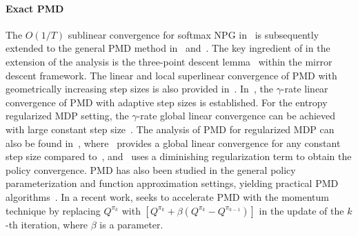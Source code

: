 \documentclass[10pt]{article}
\theoremstyle{plain}
\theoremstyle{definition}
\begin{document}
\paragraph{Exact PMD} The $O(1/T)$ sublinear convergence for softmax NPG in~\cite{Agarwal_Kakade_Lee_Mahajan_2019} is subsequently extended to the general PMD method in~\cite{Xiao_2022} and~\cite{Lan_2021}. The key ingredient of in the extension of the analysis is the three-point descent lemma~\cite{chen1993convergence} within the mirror descent framework. The linear and local superlinear convergence of PMD with geometrically increasing step sizes is also provided in~\cite{Xiao_2022}. In~\cite{Johnson_Pike-Burke_Rebeschini_2023}, the $\gamma$-rate linear convergence of PMD with adaptive step sizes is established. For the entropy regularized MDP setting, the $\gamma$-rate global linear convergence can be achieved with large constant step size~\cite{Lan_2021}. The analysis of PMD for regularized MDP can also be found in~\cite{Zhan_Cen_Huang_Chen_Lee_Chi_2021,Li_Zhao_Lan_2022}, where~\cite{Zhan_Cen_Huang_Chen_Lee_Chi_2021} provides a global linear convergence for any constant step size compared to~\cite{Lan_2021}, and~\cite{Li_Zhao_Lan_2022} uses a diminishing  regularization term to obtain the policy convergence. PMD has also been studied in the general policy parameterization and function approximation settings, yielding practical PMD algorithms~\cite{tomar2020mirror,yuan2023general}. In a recent work, \cite{chelu2024functional} seeks to accelerate PMD with the momentum technique by replacing  $Q^{\pi_k}$ with $[Q^{\pi_k}+\beta (Q^{\pi_k}-Q^{\pi_{k-1}})]$   in the update of the $k$-th iteration, where $\beta$ is a  parameter. 
\end{document}
